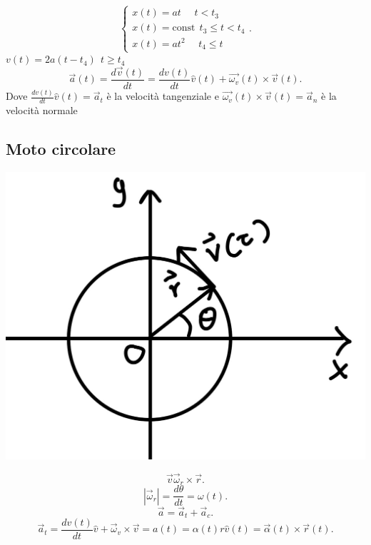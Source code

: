 \documentclass[12px]{article}
\begin{document}
	\[
	\begin{cases}
		x(t) = at \ \ \ \ \ \ t <t_3\\
		x(t) = \text{const}\ \  t_3\leq t<t_4\\
		x(t) = a t^2 \ \ \ \ \ \ t_4\leq  t
	\end{cases}
	.\] 
	$v(t) = 2a(t - t_4) \ \ t \geq t_4$\\
	\[
		\overrightarrow{a}(t) = \frac{d \overrightarrow{v}(t)}{dt} = \frac {d v(t)}{dt} \hat v (t) + \overrightarrow{\omega_v}(t) \times \overrightarrow{v}(t)
	.\] 
	Dove $\displaystyle\frac {d v(t)}{dt} \hat v (t) = \overrightarrow{a}_t$ è la velocità tangenziale e $\overrightarrow{\omega_v}(t) \times \overrightarrow{v}(t) = \overrightarrow{a}_n$ è la velocità normale\\
	\subsection{Moto circolare}
	\begin{center}
		
	\includegraphics[scale=0.15]{grafico_3}
	\end{center}
	\[
	\overrightarrow{v} \overrightarrow{\omega}_r\times \overrightarrow{r}
	.\] 
	\[
		|\overrightarrow{\omega}_r| = \frac{d \theta}{dt} = \omega (t)
	.\] 
	\[
	\overrightarrow{a} = \overrightarrow{a}_t + \overrightarrow{a}_c
	.\]
	\[
		\overrightarrow{a}_t = \frac{d v(t)}{dt}\hat v + \overrightarrow\omega_v\times \overrightarrow{v} = a(t) = \alpha(t)r\hat v(t) = \overrightarrow{\alpha}(t)\times \overrightarrow{r}(t)
	.\] 
\end{document}
